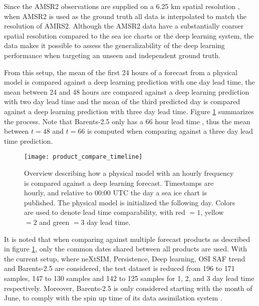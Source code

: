 \documentclass[../main/thesis.tex]{subfiles}
\begin{document}
Since the AMSR2 observations are supplied on a 6.25 km spatial resolution \citep{Spreen2008}, when AMSR2 is used as the ground truth all data is interpolated to match the resolution of AMRS2. Although the AMSR2 data have a substantially coarser spatial resolution compared to the sea ice charts or the deep learning system, the data makes it possible to assess the generalizability of the deep learning performance when targeting an unseen and independent ground truth.

From this setup, the mean of the first 24 hours of a forecast from a physical model is compared against a deep learning prediction with one day lead time, the mean between 24 and 48 hours are compared against a deep learning prediction with two day lead time and the mean of the third predicted day is compared against a deep learning prediction with three day lead time. Figure \ref{fig:product_compare_timeline} summarizes the process. Note that Barents-2.5 only has a 66 hour lead time \citep{Roehrs2022}, thus the mean between $t = 48$ and $t = 66$ is computed when comparing against a three day lead time prediction.

\begin{figure}
    \centering
    \texttt{[image: product\_compare\_timeline]}
    \caption{\label{fig:product_compare_timeline}Overview describing how a physical model with an hourly frequency is compared against a deep learning forecast. Timestamps are hourly, and relative to 00:00 UTC the day a sea ice chart is published. The physical model is initialized the following day. Colors are used to denote lead time comparability, with red $= 1$, yellow $= 2$ and green $= 3$ day lead time.}
\end{figure}

It is noted that when comparing against multiple forecast products as described in figure \ref{fig:product_compare_timeline}, only the common dates shared between all products are used. With the current setup, where neXtSIM, Persistence, Deep learning, OSI SAF trend and Barents-2.5 are considered, the test dataset is reduced from 196 to 171 samples, 147 to 130 samples and 142 to 125 samples for 1, 2, and 3 day lead time respectively. Moreover, Barents-2.5 is only considered starting with the month of June, to comply with the spin up time of its data assimilation system \citep{Roehrs2022}.
\end{document}
